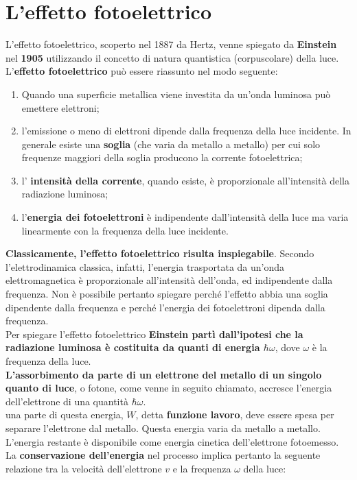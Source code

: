 \documentclass[a4paper,12pt,oneside]{book}
\begin{document}
\section{L'effetto fotoelettrico}
L'effetto fotoelettrico, scoperto nel 1887 da Hertz, venne spiegato da \textbf{Einstein} nel \textbf{1905} utilizzando il concetto di natura quantistica (corpuscolare) della luce.\\
L'\textbf{effetto fotoelettrico} può essere riassunto nel modo seguente:
\begin{enumerate}
\item Quando una superficie metallica viene investita da un'onda luminosa può emettere elettroni;
\item  l'emissione o meno di elettroni dipende dalla frequenza della luce incidente. In generale esiste una \textbf{soglia} (che varia da metallo a metallo) per cui solo frequenze maggiori della soglia producono la corrente fotoelettrica;
\item l' \textbf{intensità della corrente}, quando esiste, è proporzionale all'intensità della radiazione luminosa;
\item l'\textbf{energia dei fotoelettroni} è indipendente dall'intensità della luce ma varia linearmente con la frequenza della luce incidente.
\end{enumerate} 
\textbf{Classicamente, l'effetto fotoelettrico risulta inspiegabile}. Secondo l'elettrodinamica classica, infatti, l'energia trasportata da un'onda elettromagnetica è proporzionale all'intensità dell'onda, ed indipendente dalla frequenza. Non è possibile pertanto spiegare perché l'effetto abbia una soglia dipendente dalla frequenza e perché l'energia dei fotoelettroni dipenda dalla frequenza.\\
Per spiegare l'effetto fotoelettrico \textbf{Einstein partì dall'ipotesi che la radiazione luminosa è costituita da quanti di energia $\hbar \omega$}, dove $\omega$ è la frequenza della luce.\\
\textbf{L'assorbimento da parte di un elettrone del metallo di un singolo quanto di luce}, o fotone, come venne in seguito chiamato, accresce l'energia dell'elettrone di una quantità $\hbar \omega$.\\
una parte di questa energia, $W$, detta \textbf{funzione lavoro}, deve essere spesa per separare l'elettrone dal metallo. Questa energia varia da metallo a metallo. L'energia restante è disponibile come energia cinetica dell'elettrone fotoemesso. La \textbf{conservazione dell'energia} nel processo implica pertanto la seguente relazione tra la velocità dell'elettrone $v$ e la frequenza $\omega$ della luce:
\end{document}
